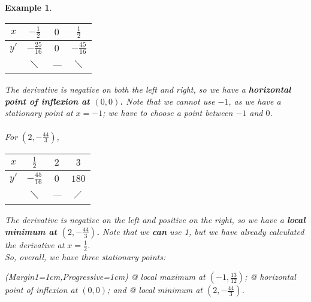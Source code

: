 \documentclass[a4paper,11pt]{article}
\newtheorem{example}{Example}
\begin{document}
\begin{example}
{		\begin{table}[H]\centering
			\begin{tabular}{c|c|c|c}
				$x$  &  $-\frac{1}{2}$  & $0$ &  $\frac{1}{2}$   \\ \hline
				$y'$ & $-\frac{25}{16}$ & $0$ & $-\frac{45}{16}$ \\
				 ~   &   $\diagdown$    & --- &   $\diagdown$
			\end{tabular}
	\end{table}}
	The derivative is negative on both the left and right, so we have a \textbf{horizontal point of inflexion at $(0,0)$.} Note that we cannot use $-1$, as we have a stationary point at $x=-1$; we have to choose a point between $-1$ and $0$.\\\\
	For $(2,-\frac{44}{3})$, 
	{\renewcommand{\arraystretch}{1.5}%
		\begin{table}[H]\centering
			\begin{tabular}{c|c|c|c}
				$x$  &  $\frac{1}{2}$   & $2$ &    $3$    \\ \hline
				$y'$ & $-\frac{45}{16}$ & $0$ &   $180$   \\
				 ~   &   $\diagdown$    & --- & $\diagup$
			\end{tabular}
	\end{table}}
	The derivative is negative on the left and positive on the right, so we have a \textbf{local minimum at $(2,-\frac{44}{3})$.} Note that we \textbf{can} use 1, but we have already calculated the derivative at $x=\frac{1}{2}$.\\
	
	\noindent So, overall, we have three stationary points:
	\vspace{0.15cm}
	\begin{easylist}[itemize]
		\ListProperties(Margin1=1cm,Progressive=1cm)
		@ local maximum at $(-1,\frac{13}{12})$;
		@ horizontal point of inflexion at $(0,0)$; and
		@ local minimum at $(2,-\frac{44}{3})$.
	\end{easylist}
\end{example}
\end{document}
